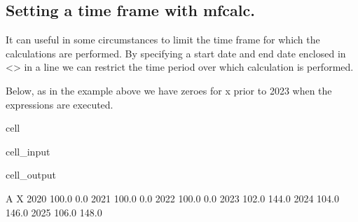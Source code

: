\documentclass[letterpaper,10pt,english]{jupyterBook}
\begin{document}
\subsection{Setting a time frame with mfcalc.}
\label{\detokenize{content/04_PythonEssentials/ExtendingDataFrames:setting-a-time-frame-with-mfcalc}}
\sphinxAtStartPar
It can useful in some circumstances to limit the time frame for which the calculations are performed. By specifying a start date and end date enclosed in <> in a  line we can restrict the time period over which calculation is performed.

\sphinxAtStartPar
Below, as in the example above we have zeroes for x prior to 2023 when the expressions are executed.

\begin{sphinxuseclass}{cell}\begin{sphinxVerbatimInput}

\begin{sphinxuseclass}{cell_input}
\begin{sphinxVerbatim}[commandchars=\\\{\}]
  


\end{sphinxVerbatim}

\end{sphinxuseclass}\end{sphinxVerbatimInput}
\begin{sphinxVerbatimOutput}

\begin{sphinxuseclass}{cell_output}
\begin{sphinxVerbatim}[commandchars=\\\{\}]
          A      X
2020  100.0    0.0
2021  100.0    0.0
2022  100.0    0.0
2023  102.0  144.0
2024  104.0  146.0
2025  106.0  148.0
\end{sphinxVerbatim}

\end{sphinxuseclass}\end{sphinxVerbatimOutput}

\end{sphinxuseclass}
\sphinxstepscope
\end{document}
